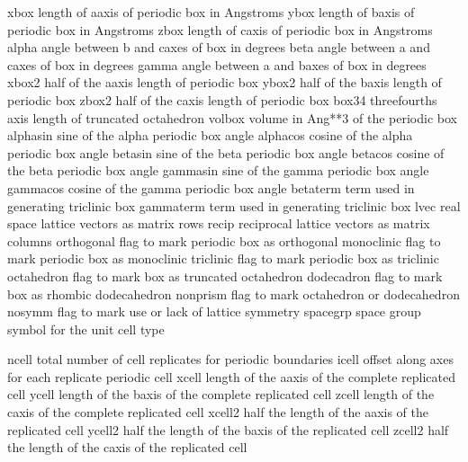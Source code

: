\documentclass[letterpaper,11pt,english]{sphinxmanual}
\begin{document}
\begin{sphinxVerbatim}[commandchars=\\\{\}]
xbox            length of a\PYGZhy{}axis of periodic box in Angstroms
ybox            length of b\PYGZhy{}axis of periodic box in Angstroms
zbox            length of c\PYGZhy{}axis of periodic box in Angstroms
alpha           angle between b\PYGZhy{} and c\PYGZhy{}axes of box in degrees
beta            angle between a\PYGZhy{} and c\PYGZhy{}axes of box in degrees
gamma           angle between a\PYGZhy{} and b\PYGZhy{}axes of box in degrees
xbox2           half of the a\PYGZhy{}axis length of periodic box
ybox2           half of the b\PYGZhy{}axis length of periodic box
zbox2           half of the c\PYGZhy{}axis length of periodic box
box34           three\PYGZhy{}fourths axis length of truncated octahedron
volbox          volume in Ang**3 of the periodic box
alpha\PYGZus{}sin       sine of the alpha periodic box angle
alpha\PYGZus{}cos       cosine of the alpha periodic box angle
beta\PYGZus{}sin        sine of the beta periodic box angle
beta\PYGZus{}cos        cosine of the beta periodic box angle
gamma\PYGZus{}sin       sine of the gamma periodic box angle
gamma\PYGZus{}cos       cosine of the gamma periodic box angle
beta\PYGZus{}term       term used in generating triclinic box
gamma\PYGZus{}term      term used in generating triclinic box
lvec            real space lattice vectors as matrix rows
recip           reciprocal lattice vectors as matrix columns
orthogonal      flag to mark periodic box as orthogonal
monoclinic      flag to mark periodic box as monoclinic
triclinic       flag to mark periodic box as triclinic
octahedron      flag to mark box as truncated octahedron
dodecadron      flag to mark box as rhombic dodecahedron
nonprism        flag to mark octahedron or dodecahedron
nosymm          flag to mark use or lack of lattice symmetry
spacegrp        space group symbol for the unit cell type
\end{sphinxVerbatim}

\sphinxAtStartPar
{}

\begin{sphinxVerbatim}[commandchars=\\\{\}]
ncell           total number of cell replicates for periodic boundaries
icell           offset along axes for each replicate periodic cell
xcell           length of the a\PYGZhy{}axis of the complete replicated cell
ycell           length of the b\PYGZhy{}axis of the complete replicated cell
zcell           length of the c\PYGZhy{}axis of the complete replicated cell
xcell2          half the length of the a\PYGZhy{}axis of the replicated cell
ycell2          half the length of the b\PYGZhy{}axis of the replicated cell
zcell2          half the length of the c\PYGZhy{}axis of the replicated cell
\end{sphinxVerbatim}
\end{document}

